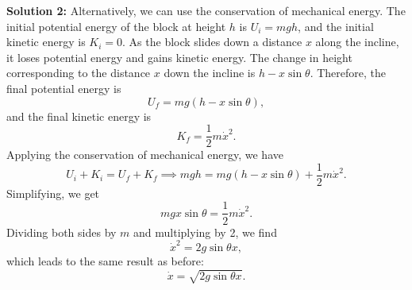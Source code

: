 \documentclass[12pt]{article}
\begin{document}
\textbf{Solution 2:}
Alternatively, we can use the conservation of mechanical energy. The initial potential energy of the block at height $h$ is $U_i = mgh$, and the initial kinetic energy is $K_i = 0$. As the block slides down a distance $x$ along the incline, it loses potential energy and gains kinetic energy. The change in height corresponding to the distance $x$ down the incline is $h - x\sin\theta$. Therefore, the final potential energy is
\begin{equation}
    U_f = mg(h - x\sin\theta),
\end{equation}
and the final kinetic energy is
\begin{equation}
    K_f = \frac{1}{2}m\dot{x}^2.
\end{equation}
Applying the conservation of mechanical energy, we have
\begin{equation}
    U_i + K_i = U_f + K_f
    \implies mgh = mg(h - x\sin\theta) + \frac{1}{2}m\dot{x}^2.
\end{equation}
Simplifying, we get
\begin{equation}
    mgx\sin\theta = \frac{1}{2}m\dot{x}^2.
\end{equation}
Dividing both sides by $m$ and multiplying by 2, we find
\begin{equation}
    \dot{x}^2 = 2g\sin\theta x,
\end{equation}
which leads to the same result as before:
\begin{equation}
    \boxed{\dot{x} = \sqrt{2g\sin\theta x}}.
\end{equation}
\end{document}
